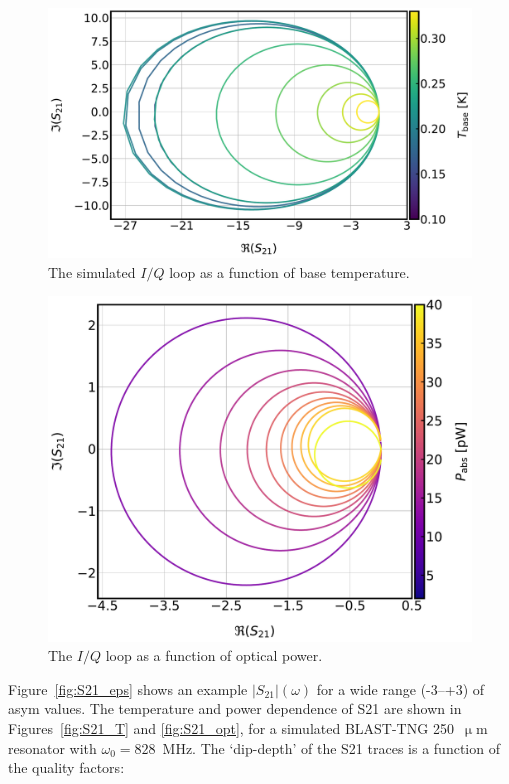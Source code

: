 \begin{figure}[!htbp]
  \centering
  \includegraphics[width=\textwidth]{figures/kid_model/IQloop_T250}
  \caption[~The simulated  loop as a function of base temperature.]{The simulated $I/Q$ loop as a function of base temperature.}
  \label{fig:IQloop_T}
\end{figure}

\begin{figure}[!htbp]
  \centering
  \includegraphics[width=\textwidth]{figures/kid_model/IQloop_opt250}
  \caption[~The simulated  loop as a function of optical power.]{The $I/Q$ loop as a function of optical power.}
  \label{fig:IQloop_P}
\end{figure}

Figure~\ref{fig:S21_eps} shows an example $\left| S_{21} \right|(\omega)$ for a wide range (-3--+3) of \gls{asym} values. The temperature and power dependence of \gls{S21} are shown in Figures~\ref{fig:S21_T} and \ref{fig:S21_opt}, for a simulated BLAST-TNG 250~$\upmu$m resonator with $\omega_{0} = 828$~MHz. The `dip-depth' of the \gls{S21} traces is a function of the quality factors:

